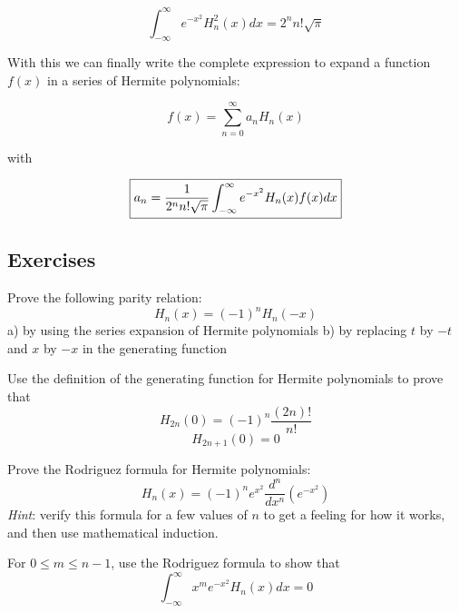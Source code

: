 \begin{equation}
\int_{-\infty}^{\infty} e^{-x^2} H_n^2(x) dx = 2^n n! \sqrt{\pi}
\end{equation} 

With this we can finally write the complete expression to expand a function $f(x)$ in a series of Hermite polynomials:

\begin{equation}
f(x) = \sum_{n=0}^{\infty}a_n H_n(x)
\end{equation} 

with

\begin{equation}
\fbox{$\displaystyle
a_n = \frac{1}{2^n n!\sqrt{\pi}} \int_{-\infty}^{\infty} e^{-x^2} H_n(x) f(x) dx
$}
\end{equation} 

\subsection{Exercises}

\begin{sidebar}
\begin{ex}
Prove the following parity relation:
$$H_n(x) = (-1)^nH_n(-x)$$
a) by using the series expansion of Hermite polynomials
b) by replacing $t$ by $-t$ and $x$ by $-x$ in the generating function
\end{ex}
\end{sidebar}

\begin{sidebar}
\begin{ex}
Use the definition of the generating function for Hermite polynomials to prove that
$$H_{2n}(0) = (-1)^n \frac{(2n)!}{n!}$$
$$H_{2n+1}(0) = 0$$
\end{ex}
\end{sidebar}

\begin{sidebar}
\begin{ex}
Prove the Rodriguez formula for Hermite polynomials:
$$H_n(x) = (-1)^n e^{x^2}\frac{d^n}{d x^n}\left(e^{-x^2}\right)$$
\emph{Hint}: verify this formula for a few values of $n$ to get a feeling for how it works, and then use mathematical induction.
\end{ex}
\end{sidebar}

\begin{sidebar}
\begin{ex}
For $0 \leq m \leq n-1$, use the Rodriguez formula to show that 
$$\int_{-\infty}^{\infty}x^m e^{-x^2} H_n(x) dx = 0$$
\end{ex}
\end{sidebar}

